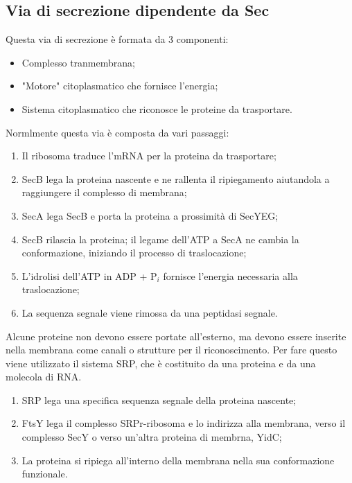 \subsection{Via di secrezione dipendente da Sec}
Questa via di secrezione \`e formata da 3 componenti:
\begin{itemize}
    \item Complesso tranmembrana; 
    \item "Motore" citoplasmatico che fornisce l'energia; 
    \item Sistema citoplasmatico che riconosce le proteine da trasportare.
\end{itemize}
Normlmente questa via \`e composta da vari passaggi: 
\begin{enumerate}
    \item Il ribosoma traduce l'mRNA per la proteina da trasportare; 
    \item SecB lega la proteina nascente e ne rallenta il ripiegamento aiutandola a raggiungere il complesso di membrana; 
    \item SecA lega SecB e porta la proteina a prossimit\`a di SecYEG; 
    \item SecB rilascia la proteina; il legame dell'ATP a SecA ne cambia la conformazione, iniziando il processo di traslocazione; 
    \item L'idrolisi dell'ATP in ADP + P$_i$ fornisce l'energia necessaria alla traslocazione;
    \item La sequenza segnale viene rimossa da una peptidasi segnale.
\end{enumerate}
Alcune proteine non devono essere portate all'esterno, ma devono essere inserite nella membrana come canali o strutture per il riconoscimento. Per fare questo viene utilizzato il sistema SRP, che \`e costituito da una proteina e da una molecola di RNA.
\begin{enumerate}
    \item SRP lega una specifica sequenza segnale della proteina nascente; 
    \item FtsY lega il complesso SRPr-ribosoma e lo indirizza alla membrana, verso il complesso SecY o verso un'altra proteina di membrna, YidC;
    \item La proteina si ripiega all'interno della membrana nella sua conformazione funzionale.
\end{enumerate}
